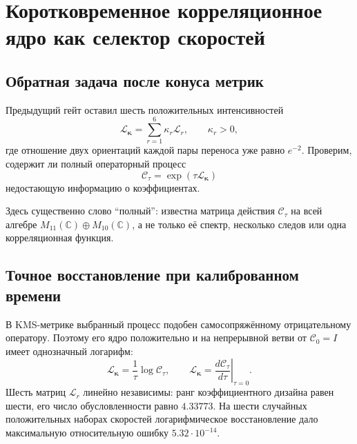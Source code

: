 \chapter{Коротковременное корреляционное ядро как селектор скоростей}
\label{ch:v8-correlation-kernel-short-time-rate-selector-gate}

\section{Обратная задача после конуса метрик}

Предыдущий гейт оставил шесть положительных интенсивностей
\begin{equation}
 \mathcal L_{\boldsymbol\kappa}=\sum_{r=1}^{6}\kappa_r\mathcal L_r,
 \qquad \kappa_r>0,
 \label{eq:v8-rate-selector-generator}
\end{equation}
где отношение двух ориентаций каждой пары переноса уже равно $e^{-2}$.
Проверим, содержит ли полный операторный процесс
\begin{equation}
 \mathcal C_\tau=\exp(\tau\mathcal L_{\boldsymbol\kappa})
 \label{eq:v8-rate-selector-kernel}
\end{equation}
недостающую информацию о коэффициентах.

Здесь существенно слово ``полный'': известна матрица действия
$\mathcal C_\tau$ на всей алгебре $M_{11}(\mathbb C)\oplus M_{10}(\mathbb
C)$, а не только её спектр, несколько следов или одна корреляционная
функция.

\section{Точное восстановление при калиброванном времени}

В KMS-метрике выбранный процесс подобен самосопряжённому отрицательному
оператору. Поэтому его ядро положительно и на непрерывной ветви от
$\mathcal C_0=I$ имеет однозначный логарифм:
\begin{equation}
 \mathcal L_{\boldsymbol\kappa}
 =\frac{1}{\tau}\log\mathcal C_\tau,
 \qquad
 \mathcal L_{\boldsymbol\kappa}
 =\left.\frac{d\mathcal C_\tau}{d\tau}\right|_{\tau=0}.
 \label{eq:v8-rate-selector-log-derivative}
\end{equation}
Шесть матриц $\mathcal L_r$ линейно независимы: ранг коэффициентного
дизайна равен шести, его число обусловленности равно $4.33773$. На шести
случайных положительных наборах скоростей логарифмическое восстановление
дало максимальную относительную ошибку $5.32\cdot10^{-14}$.

